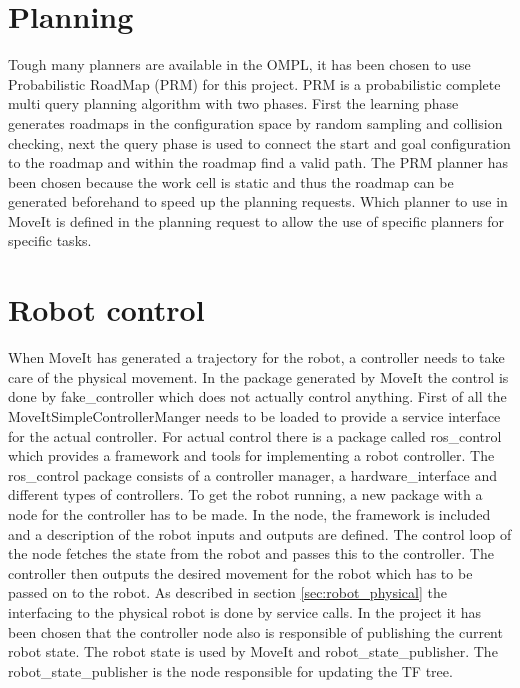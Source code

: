

\section{Planning}
\label{sec:planning}

Tough many planners are available in the OMPL, it has been chosen to use Probabilistic RoadMap (PRM) for this project. PRM is a probabilistic complete multi query planning algorithm with two phases. First the learning phase generates roadmaps in the configuration space by random sampling and collision checking, next the query phase is used to connect the start and goal configuration to the roadmap and within the roadmap find a valid path. The PRM planner has been chosen because the work cell is static and thus the roadmap can be generated beforehand to speed up the planning requests. Which planner to use in MoveIt is defined in the planning request to allow the use of specific planners for specific tasks.






\section{Robot control}
\label{sec:robot_control}
When MoveIt has generated a trajectory for the robot, a controller needs to take care of the physical movement. In the package generated by MoveIt the control is done by fake\_controller which does not actually control anything. First of all the MoveItSimpleControllerManger needs to be loaded to provide a service interface for the actual controller. For actual control there is a package called ros\_control which provides a framework and tools for implementing a robot controller. The ros\_control package consists of a controller manager, a hardware\_interface and different types of controllers. To get the robot running, a new package with a node for the controller has to be made. In the node, the framework is included and a description of the robot inputs and outputs are defined. The control loop of the node fetches the state from the robot and passes this to the controller. The controller then outputs the desired movement for the robot which has to be passed on to the robot. As described in section \ref{sec:robot_physical} the interfacing to the physical robot is done by service calls. In the project it has been chosen that the controller node also is responsible of publishing the current robot state. The robot state is used by MoveIt and robot\_state\_publisher. The robot\_state\_publisher is the node responsible for updating the TF tree. 



